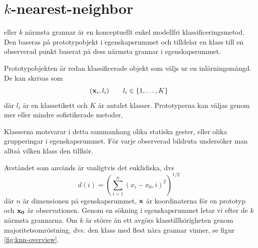 \documentclass[../rapport_MVEX01-11-05]{subfiles}
\begin{document}
\section{$k$-nearest-neighbor}\label{sec:knn}

\knn eller $k$ närmsta grannar är en konceptuellt enkel modellfri
klassificeringsmetod.
Den baseras på prototypobjekt i egenskapsrummet och tilldelar en klass
till en observerad punkt baserat på dess närmsta grannar i egenskapsrummet.

Prototypobjekten är redan klassificerade objekt som väljs ur en inlärningsmängd.
De kan skrivas som
\begin{equation*}
    (\mathbf{x}_i, l_i)\qquad l_i \in \{ 1,\dotsc,K \}
\end{equation*}
där $l_i$ är en klassetikett och $K$ är antalet klasser.
Prototyperna kan väljas genom mer eller mindre sofistikerade metoder,


Klasserna motsvarar i detta sammanhang olika statiska gester,
eller olika grupperingar i egenskapsrummet. För
varje observerad bildruta undersöker man alltså vilken klass den tillhör.

Avståndet som används är vanligtvis det euklidiska, dvs
\begin{equation*}
    d(i) = \left(\sum_{i=1}^n(x_i-x_0,i)^2\right)^{1/2}
\end{equation*}
där $n$ är dimensionen på egenskapsrummet, $\mathbf{x}$ är koordinaterna för en
prototyp och $\mathbf{x_0}$ är observationen. Genom en sökning i
egenskapsrummet letar vi efter de $k$ närmsta grannarna. Om $k$ är större än ett
avgörs klasstillhörigheten genom majoritetsomröstning, dvs. den klass med flest
nära grannar vinner, se figur \ref{fig:knn-overview}.
\end{document}
